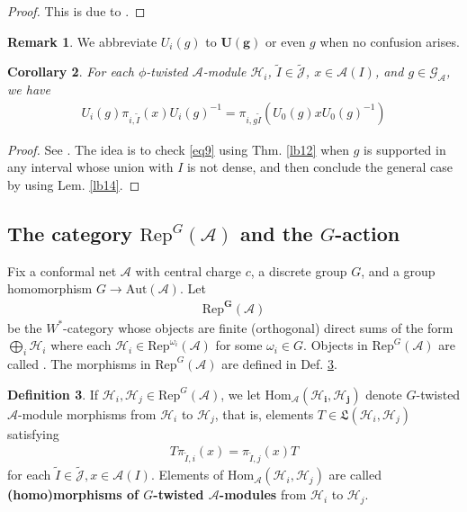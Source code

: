 \documentclass[11pt,b5paper,notitlepage]{article}
\theoremstyle{definition}
\newtheorem{df}{Definition}[section]
\newtheorem{rem}[df]{Remark}
\theoremstyle{plain}
\newtheorem{co}[df]{Corollary}
\newcommand{\fk}{\mathfrak}
\newcommand{\wtd}{\widetilde}
\newcommand{\Hom}{\mathrm{Hom}}
\newcommand{\Rep}{\mathrm{Rep}}
\newcommand{\RepGA}{\mathrm{Rep}^G(\mathcal A)}
\newcommand{\GA}{\mathscr G_{\mathcal A}}
\newcommand{\Jtd}{\widetilde{\mathcal J}}
\newcommand{\Aut}{\mathrm{Aut}}
\newcommand{\MA}{\mathcal A}
\newcommand{\MH}{\mathcal H}
\numberwithin{equation}{section}
\begin{document}
\begin{proof}
This is due to \cite[Lem. 17]{Hen19}.
\end{proof}


\begin{rem}
We abbreviate $U_i(g)$ to $\pmb{U(g)}$ or even $g$ when no confusion arises.
\end{rem}



\begin{co}\label{lb30}
For each $\phi$-twisted $\MA$-module $\MH_i$, $\wtd I\in\Jtd$, $x\in\MA(I)$, and $g\in\GA$, we have
\begin{align}\label{eq9}
U_i(g)\pi_{i,\wtd I}(x)U_i(g)^{-1}=\pi_{i,g\wtd I}(U_0(g)xU_0(g)^{-1})
\end{align}
\end{co}

\begin{proof}
See \cite[Cor. 3.16]{MS26a}. The idea is to check \eqref{eq9} using Thm. \ref{lb12} when $g$ is supported in any interval whose union with $I$ is not dense, and then conclude the general case by using Lem. \ref{lb14}.
\end{proof}











\subsection{The category $\RepGA$ and the $G$-action}


Fix a conformal net $\MA$ with central charge $c$, a discrete group $G$, and a group homomorphism $G\rightarrow\Aut(\MA)$. Let
\begin{align*}
\pmb{\Rep^G(\MA)}
\end{align*}
be the $W^*$-category whose objects are finite (orthogonal) direct sums of the form $\bigoplus_i \MH_i$ where each $\MH_i\in\Rep^{\omega_i}(\MA)$ for some $\omega_i\in G$. Objects in $\RepGA$ are called \pmb{$G$-twisted $\MA$-modules}. The morphisms in $\RepGA$ are defined in Def. \ref{lb137}.



\begin{df}\label{lb137}
If $\MH_i,\MH_j\in\RepGA$, we let $\pmb{\Hom_\MA(\MH_i,\MH_j)}$ denote $G$-twisted $\MA$-module morphisms from $\MH_i$ to $\MH_j$, that is, elements $T\in\fk L(\MH_i,\MH_j)$ satisfying
\begin{align*}
T\pi_{\wtd I,i}(x)=\pi_{\wtd I,j}(x)T
\end{align*}
for each $\wtd I\in\Jtd,x\in\MA(I)$. Elements of $\Hom_\MA(\MH_i,\MH_j)$ are called \textbf{(homo)morphisms of $G$-twisted $\MA$-modules} from $\MH_i$ to $\MH_j$.
\end{df}
\end{document}
